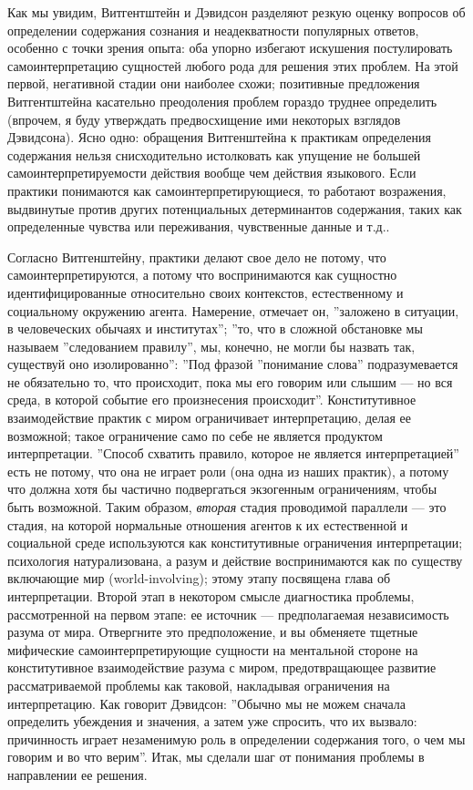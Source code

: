 \documentclass[11pt]{book}
\begin{document}
Как мы увидим, Витгентштейн и Дэвидсон разделяют резкую оценку вопросов об определении содержания сознания и неадекватности популярных ответов, особенно с точки зрения опыта: оба упорно избегают искушения постулировать самоинтерпретацию сущностей любого рода для решения этих проблем. На этой первой, негативной стадии они наиболее схожи; позитивные предложения Витгентштейна касательно преодоления проблем гораздо труднее определить (впрочем, я буду утверждать предвосхищение ими некоторых взглядов Дэвидсона). Ясно одно: обращения Витгенштейна к практикам определения содержания нельзя снисходительно истолковать как упущение не большей самоинтерпретируемости действия вообще чем действия языкового. Если практики понимаются как самоинтерпретирующиеся, то работают возражения, выдвинутые против других потенциальных детерминантов содержания, таких как определенные чувства или переживания, чувственные данные и т.д..

Согласно Витгенштейну, практики делают свое дело не потому, что самоинтерпретируются, а потому что воспринимаются как сущностно идентифицированные относительно своих контекстов, естественному и социальному окружению агента. Намерение, отмечает он, ''заложено в ситуации, в человеческих обычаях и институтах''; ''то, что в сложной обстановке мы называем ''следованием правилу'', мы, конечно, не могли бы назвать так, существуй оно изолированно'': ''Под фразой ''понимание слова'' подразумевается не обязательно то, что происходит, пока мы его говорим или слышим --- но вся среда, в которой событие его произнесения происходит''. Конститутивное взаимодействие практик с миром ограничивает интерпретацию, делая ее возможной; такое ограничение само по себе не является продуктом интерпретации. ''Способ схватить правило, которое не является интерпретацией'' есть не потому, что она не играет роли (она одна из наших практик), а потому что должна хотя бы частично подвергаться экзогенным ограничениям, чтобы быть возможной. Таким образом, \textit{вторая} стадия проводимой параллели --- это стадия, на которой нормальные отношения агентов к их естественной и социальной среде используются как конститутивные ограничения интерпретации; психология натурализована, а разум и действие воспринимаются как по существу включающие мир (world-involving); этому этапу посвящена глава об интерпретации. Второй этап  в некотором смысле диагностика проблемы, рассмотренной на первом этапе: ее источник --- предполагаемая независимость разума от мира. Отвергните это предположение, и вы обменяете тщетные мифические самоинтерпретирующие сущности на ментальной стороне на конститутивное взаимодействие разума с миром, предотвращающее развитие рассматриваемой проблемы как таковой, накладывая ограничения на интерпретацию. Как говорит Дэвидсон: ''Обычно мы не можем сначала определить убеждения и значения, а затем уже спросить, что их вызвало: причинность играет незаменимую роль в определении содержания того, о чем мы говорим и во что верим''. Итак, мы сделали шаг от понимания проблемы в направлении ее решения.
\end{document}
